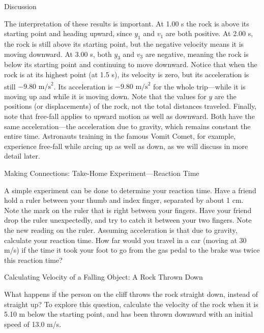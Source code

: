 \documentclass[
]{book}
\newenvironment{tinysection}{}{}
\newenvironment{note}{}{}
\begin{document}
\begin{tinysection}

{Discussion}

\end{tinysection}

The interpretation of these results is important. At 1.00 s the rock is
above its starting point and heading upward, since \(y_{1}{}\) and
\(v_{1}{}\) are both positive. At 2.00 s, the rock is still above its
starting point, but the negative velocity means it is moving downward.
At 3.00 s, both \(y_{3}{}\) and \(v_{3}{}\) are negative, meaning the rock
is below its starting point and continuing to move downward. Notice that
when the rock is at its highest point (at 1.5 s), its velocity is zero,
but its acceleration is still \({{- 9}\text{.}\text{80\ m/s}^{2}}{}\). Its
acceleration is
\({{- 9}\text{.}\text{80\ m/s}^{2}}{}\)\textsuperscript{}
for the whole trip---while it is moving up and while it is moving down.
Note that the values for \(y{}\)\emph{} are the
positions (or displacements) of the rock, not the total distances
traveled. Finally, note that free-fall applies to upward motion as well
as downward. Both have the same acceleration---the acceleration due to
gravity, which remains constant the entire time. Astronauts training in
the famous Vomit Comet, for example, experience free-fall while arcing
up as well as down, as we will discuss in more detail later.

\hypertarget{fs-id1773192}{}
\begin{note}

Making Connections: Take-Home Experiment---Reaction Time

A simple experiment can be done to determine your reaction time. Have a
friend hold a ruler between your thumb and index finger, separated by
about 1 cm. Note the mark on the ruler that is right between your
fingers. Have your friend drop the ruler unexpectedly, and try to catch
it between your two fingers. Note the new reading on the ruler. Assuming
acceleration is that due to gravity, calculate your reaction time. How
far would you travel in a car (moving at 30 m/s) if the time it took
your foot to go from the gas pedal to the brake was twice this reaction
time?

\end{note}

\hypertarget{fs-id2186600}{}
Calculating Velocity of a Falling Object: A Rock Thrown Down

What happens if the person on the cliff throws the rock straight down,
instead of straight up? To explore this question, calculate the velocity
of the rock when it is 5.10 m below the starting point, and has been
thrown downward with an initial speed of 13.0 m/s.
\end{document}
